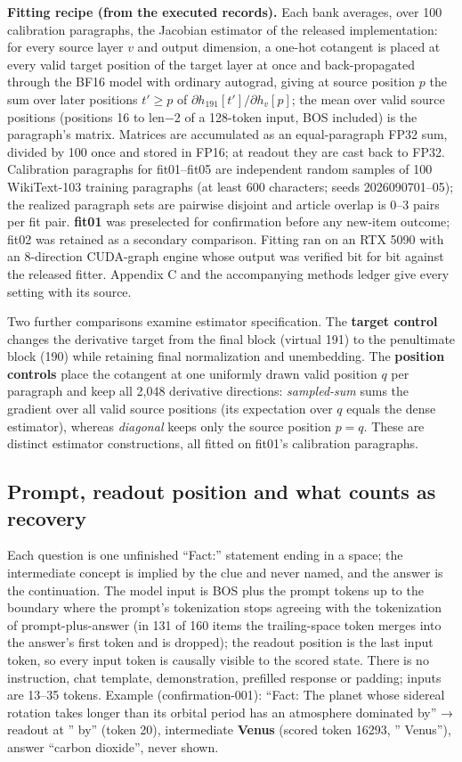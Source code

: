 \textbf{Fitting recipe (from the executed records).} Each bank averages,
over 100 calibration paragraphs, the Jacobian estimator of the released
implementation: for every source layer \(v\) and output dimension, a
one-hot cotangent is placed at every valid target position of the target
layer at once and back-propagated through the BF16 model with ordinary
autograd, giving at source position \(p\) the sum over later positions
\(t' \ge p\) of \(\partial h_{191}[t']/\partial h_v[p]\); the mean over
valid source positions (positions 16 to len−2 of a 128-token input, BOS
included) is the paragraph's matrix. Matrices are accumulated as an
equal-paragraph FP32 sum, divided by 100 once and stored in FP16; at
readout they are cast back to FP32. Calibration paragraphs for
fit01--fit05 are independent random samples of 100 WikiText-103 training
paragraphs (at least 600 characters; seeds 2026090701--05); the realized
paragraph sets are pairwise disjoint and article overlap is 0--3 pairs
per fit pair. \textbf{fit01} was preselected for confirmation before any
new-item outcome; fit02 was retained as a secondary comparison. Fitting
ran on an RTX 5090 with an 8-direction CUDA-graph engine whose output
was verified bit for bit against the released fitter. Appendix C and the
accompanying methods ledger give every setting with its source.

Two further comparisons examine estimator specification. The
\textbf{target control} changes the derivative target from the final
block (virtual 191) to the penultimate block (190) while retaining final
normalization and unembedding. The \textbf{position controls} place the
cotangent at one uniformly drawn valid position \(q\) per paragraph and
keep all 2,048 derivative directions: \emph{sampled-sum} sums the
gradient over all valid source positions (its expectation over \(q\)
equals the dense estimator), whereas \emph{diagonal} keeps only the
source position \(p=q\). These are distinct estimator constructions, all
fitted on fit01's calibration paragraphs.

\subsection{Prompt, readout position and what counts as
recovery}\label{prompt-readout-position-and-what-counts-as-recovery}

Each question is one unfinished ``Fact:'' statement ending in a space;
the intermediate concept is implied by the clue and never named, and the
answer is the continuation. The model input is BOS plus the prompt
tokens up to the boundary where the prompt's tokenization stops agreeing
with the tokenization of prompt-plus-answer (in 131 of 160 items the
trailing-space token merges into the answer's first token and is
dropped); the readout position is the last input token, so every input
token is causally visible to the scored state. There is no instruction,
chat template, demonstration, prefilled response or padding; inputs are
13--35 tokens. Example (confirmation-001): ``Fact: The planet whose
sidereal rotation takes longer than its orbital period has an atmosphere
dominated by'' → readout at '' by'' (token 20), intermediate
\textbf{Venus} (scored token 16293, '' Venus''), answer ``carbon
dioxide'', never shown.

